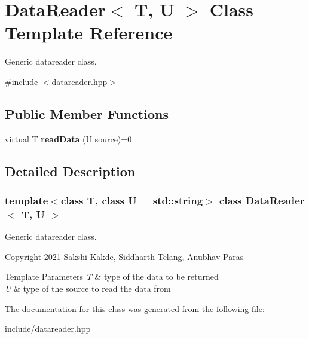 \hypertarget{classDataReader}{}\section{Data\+Reader$<$ T, U $>$ Class Template Reference}
\label{classDataReader}


Generic datareader class.  




{\ttfamily \#include $<$datareader.\+hpp$>$}

\subsection*{Public Member Functions}
\begin{DoxyCompactItemize}
\item 
\mbox{\label{classDataReader_aeb6998fceb0145227afd8cc5ef65333b}} 
virtual T {\bfseries read\+Data} (U source)=0
\end{DoxyCompactItemize}


\subsection{Detailed Description}
\subsubsection*{template$<$class T, class U = std\+::string$>$\newline
class Data\+Reader$<$ T, U $>$}

Generic datareader class. 

Copyright 2021 Sakshi Kakde, Siddharth Telang, Anubhav Paras 
\begin{DoxyTemplParams}{Template Parameters}
{\em T} & type of the data to be returned \\
\hline
{\em U} & type of the source to read the data from \\
\hline
\end{DoxyTemplParams}


The documentation for this class was generated from the following file\+:\begin{DoxyCompactItemize}
\item 
include/datareader.\+hpp\end{DoxyCompactItemize}
